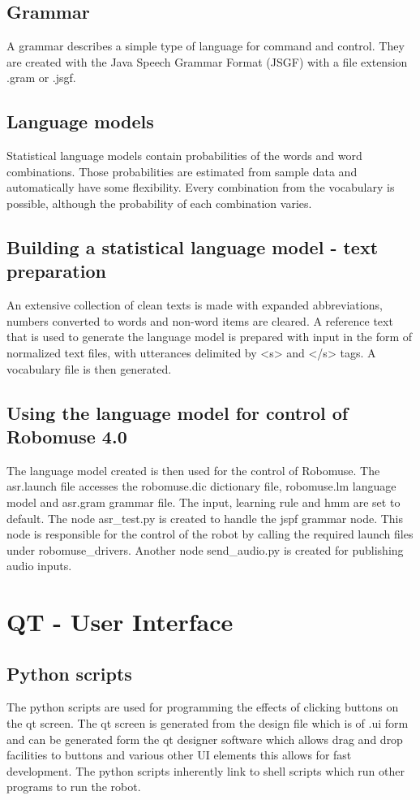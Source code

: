 \documentclass[12pt]{article}
\begin{document}
\subsection{Grammar}
A grammar describes a simple type of language for command and control. They are created with the Java Speech Grammar Format (JSGF) with a file extension .gram or .jsgf.

\subsection{Language models}
Statistical language models contain probabilities of the words and word combinations. Those probabilities are estimated from sample data and automatically have some flexibility. Every combination from the vocabulary is possible, although the probability of each combination varies.

\subsection{Building a statistical language model - text preparation}
An extensive collection of clean texts is made with expanded abbreviations, numbers converted to words and non-word items are cleared. A reference text that is used to generate the language model is prepared with input in the form of normalized text files, with utterances delimited by <s> and </s> tags. A vocabulary file is then generated.

\subsection{Using the language model for control of Robomuse 4.0}
The language model created is then used for the control of Robomuse. The asr.launch file accesses the robomuse.dic dictionary file, robomuse.lm language model and asr.gram grammar file. The input, learning rule and hmm are set to default. The node asr\_test.py is created to handle the jspf grammar node. This node is responsible for the control of the robot by calling the required launch files under robomuse\_drivers. Another node send\_audio.py is created for publishing audio inputs.

\newpage

\section{QT - User Interface}

\subsection{Python scripts}
The python scripts are used for programming the effects of clicking buttons on the qt screen. The qt screen is generated from the design file which is of .ui form and can be generated form the qt designer software which allows drag and drop facilities to buttons and various other UI elements this allows for fast development. The python scripts inherently link to shell scripts which run other programs to run the robot.
\end{document}
